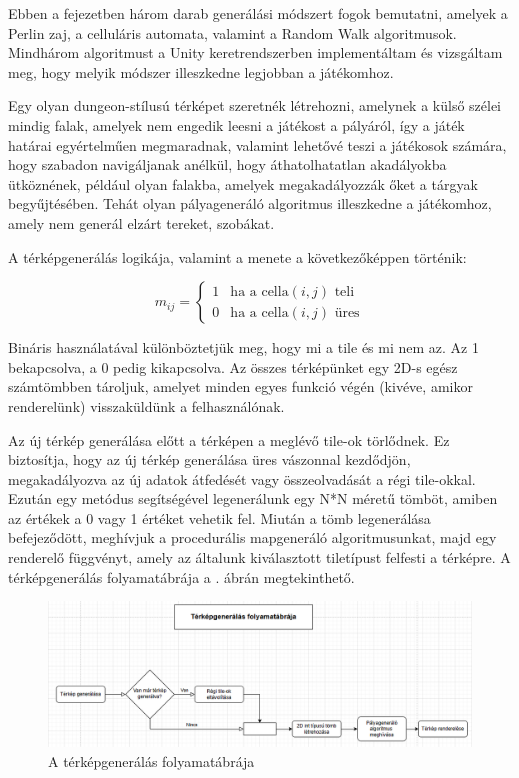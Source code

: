
Ebben a fejezetben három darab generálási módszert fogok bemutatni, amelyek a Perlin zaj, a celluláris automata, valamint a Random Walk algoritmusok. Mindhárom algoritmust a Unity keretrendszerben implementáltam és vizsgáltam meg, hogy melyik módszer illeszkedne legjobban a játékomhoz.


Egy olyan dungeon-stílusú térképet szeretnék létrehozni, amelynek a külső szélei mindig falak, amelyek nem engedik leesni a játékost a pályáról, így a játék határai egyértelműen megmaradnak, valamint lehetővé teszi a játékosok számára, hogy szabadon navigáljanak anélkül, hogy áthatolhatatlan akadályokba ütköznének, például olyan falakba, amelyek megakadályozzák őket a tárgyak begyűjtésében. Tehát olyan pályageneráló algoritmus illeszkedne a játékomhoz, amely nem generál elzárt tereket, szobákat.

A térképgenerálás logikája, valamint a menete a következőképpen történik:

\[
m_{ij} = 
\begin{cases} 
1 & \text{ha a cella} (i,j) \text{ teli} \\
0 & \text{ha a cella} (i,j) \text{ üres}
\end{cases}
\]

Bináris használatával különböztetjük meg, hogy mi a tile és mi nem az. Az 1 bekapcsolva, a 0 pedig kikapcsolva. Az összes térképünket egy 2D-s egész számtömbben tároljuk, amelyet minden egyes funkció végén (kivéve, amikor renderelünk) visszaküldünk a felhasználónak.\cite{mapgenerator}

Az új térkép generálása előtt a térképen a meglévő tile-ok törlődnek. Ez biztosítja, hogy az új térkép generálása üres vászonnal kezdődjön, megakadályozva az új adatok átfedését vagy összeolvadását a régi tile-okkal. Ezután egy metódus segítségével legenerálunk egy N*N méretű tömböt, amiben az értékek a 0 vagy 1 értéket vehetik fel. Miután a tömb legenerálása befejeződött, meghívjuk a procedurális mapgeneráló algoritmusunkat, majd egy renderelő függvényt, amely az általunk kiválasztott tiletípust felfesti a térképre. A térképgenerálás folyamatábrája a . ábrán megtekinthető.\cite{mapgenerator}

\begin{figure}[ht]
\centering
\includegraphics[width=\textwidth]{images/generationflowchart.png}
\caption{A térképgenerálás folyamatábrája}
\label{fig:generationflowchart}
\end{figure}

